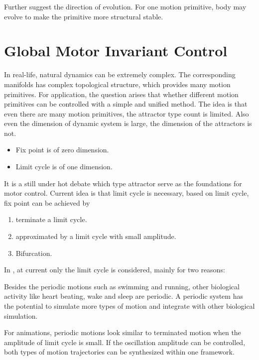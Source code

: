 Further \moit suggest the direction of evolution.
For one motion primitive, body may evolve to make the primitive more structural stable.






\section{Global Motor Invariant Control}
\label{sec:cpgcontrol}

In real-life,  natural dynamics can be extremely complex. 
The corresponding manifolds has complex topological structure, which provides many motion primitives.
For \cms application, the question arises that whether different motion primitives can be controlled with a simple and unified method.
The idea is that even there are many motion primitives, the attractor type count is limited. 
Also even the dimension of dynamic system is large, the dimension of the attractors is not. 
\begin{itemize}
\item Fix point is of zero dimension. 
\item Limit cycle is of one dimension.
\end{itemize}



It is a still under hot debate which type attractor serve as the foundations for motor control\citep{Degallier2010}.
Current idea is that limit cycle is necessary, based on limit cycle, fix point can be achieved by
\begin{enumerate} 
\item terminate a limit cycle. 
\item approximated by a limit cycle with small amplitude.
\item Bifurcation. 
\end{enumerate}


In \moit, at current only the limit cycle is considered, mainly for two reasons: 
\begin{itemize}
Besides the periodic motions such as swimming and running, other biological activity like heart beating, wake and sleep  are periodic.
A periodic system has the potential to simulate more types of motion and integrate with other biological simulation.

For animations, periodic motions look similar to terminated motion when the amplitude of limit cycle is small. 
If the oscillation amplitude can be controlled, both types of motion trajectories can be synthesized within one framework.
\end{itemize}

